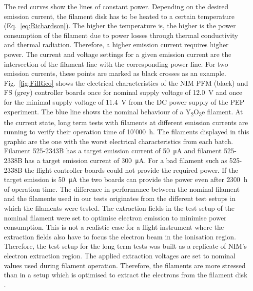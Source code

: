 		The red curves show the lines of constant power. Depending on the desired emission current, the filament disk has to be heated to a certain temperature (Eq.~\eqref{eq:Richardson}). The higher the temperature is, the higher is the power consumption of the filament due to power losses through thermal conductivity and thermal radiation. Therefore, a higher emission current requires higher power. The current and voltage settings for a given emission current are the intersection of the filament line with the corresponding power line. For two emission currents, these points are marked as black crosses as an example.\\
		Fig.~\ref{fig:FilRico} shows the electrical characteristics of the NIM PFM (black) and FS (grey) controller boards once for nominal supply voltage of 12.0~V and once for the minimal supply voltage of 11.4~V from the DC power supply of the PEP experiment. The blue line shows the nominal behaviour of a Y\textsubscript{2}O\textsubscript{3}e filament. At the current state, long term tests with filaments at different emission currents are running to verify their operation time of 10'000~h. The filaments displayed in this graphic are the one with the worst electrical characteristics from each batch. Filament 525-2343B has a target emission current of 50~\si{\micro\ampere} and filament 525-2338B has a target emission current of 300~\si{\micro\ampere}. For a bad filament such as 525-2338B the flight controller boards could not provide the required power. If the target emission is 50~\si{\micro\ampere} the two boards can provide the power even after 2300~h of operation time. The difference in performance between the nominal filament and the filaments used in our tests originates from the different test setups in which the filaments were tested. The extraction fields in the test setup of the nominal filament were set to optimise electron emission to minimise power consumption. This is not a realistic case for a flight instrument where the extraction fields also have to focus the electron beam in the ionisation region. Therefore, the test setup for the long term tests was built as a replicate of NIM's electron extraction region. The applied extraction voltages are set to nominal values used during filament operation. Therefore, the filaments are more stressed than in a setup which is optimised to extract the electrons from the filament disk \cite{Diss_Fausch}.
		
		
